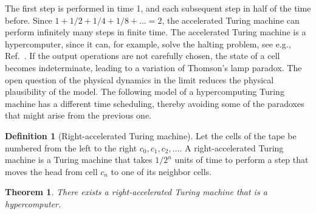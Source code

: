 \documentclass[pre,showpacs,showkeys,preprint]{revtex4}
\newtheorem{theorem}{Theorem}
\theoremstyle{definition}
\newtheorem{defn}{Definition}
\begin{document}
The first step is performed in time 1, and each subsequent step in half of the time before.
Since $1 + 1/2 + 1/4 + 1/8 + \ldots = 2$, the accelerated Turing machine can perform infinitely many steps
in finite time.
The accelerated Turing machine is a hypercomputer, since it can, for example, solve the halting problem, see e.g., Ref.~\cite{ord-2006}.
If the output operations are not carefully chosen, the state of a cell becomes indeterminate, leading to
 a variation of Thomson's lamp paradox.
The open question of the physical dynamics in the limit
reduces the physical plausibility of the model.
The following model of a hypercomputing Turing machine has a different time scheduling, thereby avoiding
some of the paradoxes that might arise from the previous one.

\begin{defn}[Right-accelerated Turing machine]
Let the cells of the tape be numbered from the left to the right $c_0, c_1, c_2, \ldots$.
A right-accelerated Turing machine is a Turing machine that takes $1/2^n$ units of time to perform a step that moves the head from cell
$c_n$ to one of its neighbor cells.
\end{defn}

\begin{theorem}
\label{th-right-acc-tm}
There exists a right-accelerated Turing machine that is a hypercomputer.
\end{theorem}
\end{document}
